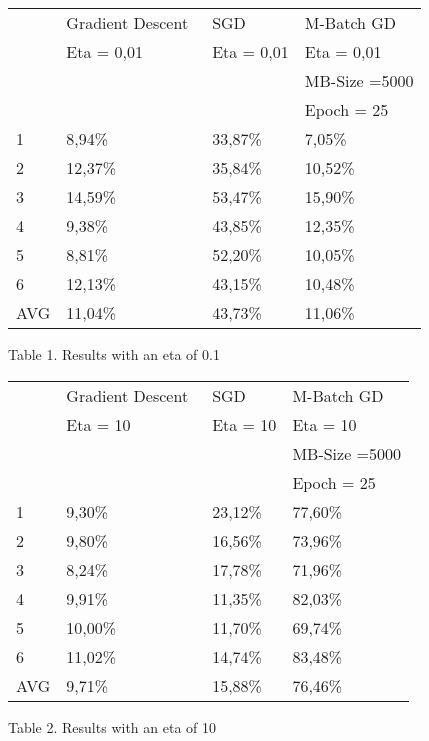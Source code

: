 \documentclass[a4paper, 12pt]{amsart}
\begin{document}
\centering
\begin{tabular}{l|lll}
~       & Gradient Descent~ & SGD     & M-Batch GD  \\ 
        &   Eta = 0,01      &   Eta = 0,01& Eta = 0,01       \\
        &                   &         & MB-Size =5000        \\
        &                   &         & Epoch = 25          \\
\hline
1       & 8,94\%            & 33,87\% & 7,05\%      \\
2       & 12,37\%           & 35,84\% & 10,52\%     \\
3       & 14,59\%           & 53,47\% & 15,90\%     \\
4       & 9,38\%            & 43,85\% & 12,35\%     \\
5       & 8,81\%            & 52,20\% & 10,05\%     \\
6       & 12,13\%           & 43,15\% & 10,48\%     \\
AVG     & 11,04\%           & 43,73\% & 11,06\%    \\
\end{tabular}
\begin{center}
Table 1. Results with an eta of 0.1
\end{center}
\centering
\begin{tabular}{l|lll}
~       & Gradient Descent~ & SGD     & M-Batch GD  \\ 
        &   Eta = 10        &   Eta = 10& Eta = 10        \\
        &                   &         & MB-Size =5000        \\
        &                   &         & Epoch = 25          \\
\hline
1       & 9,30\%            & 23,12\% & 77,60\%      \\
2       & 9,80\%           & 16,56\% & 73,96\%     \\
3       & 8,24\%           & 17,78\% & 71,96\%     \\
4       & 9,91\%           & 11,35\% & 82,03\%     \\
5       & 10,00\%           & 11,70\% & 69,74\%     \\
6       & 11,02\%           & 14,74\% & 83,48\%     \\
AVG     & 9,71\%           & 15,88\% & 76,46\%    
\end{tabular}
\begin{center}
Table 2. Results with an eta of 10
\end{center}
\end{document}
